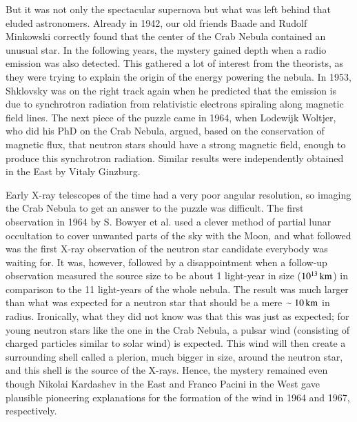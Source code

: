 But it was not only the spectacular supernova but what was left behind that eluded astronomers.
Already in 1942, our old friends Baade and Rudolf Minkowski correctly found that the center of the Crab Nebula contained an unusual star.\cite{Baade42, Minkowski42}
In the following years, the mystery gained depth when a radio emission was also detected.\cite{BSS49}
This gathered a lot of interest from the theorists, as they were trying to explain the origin of the energy powering the nebula.
In 1953, Shklovsky was on the right track again when he predicted that the emission is due to synchrotron radiation from relativistic electrons spiraling along magnetic field lines. 
The next piece of the puzzle came in 1964, when Lodewijk Woltjer, who did his PhD on the Crab Nebula, argued, based on the conservation of magnetic flux, that neutron stars should have a strong magnetic field, enough to produce this synchrotron radiation.\cite{Woltjer64}
Similar results were independently obtained in the East by Vitaly Ginzburg.\cite{Ginzburg64}


Early X-ray telescopes of the time had a very poor angular resolution, so imaging the Crab Nebula to get an answer to the puzzle was difficult.
The first observation in 1964 by S. Bowyer et al. used a clever method of partial lunar occultation to cover unwanted parts of the sky with the Moon, and what followed was the first X-ray observation of the neutron star candidate everybody was waiting for.\cite{BBC64a}
It was, however, followed by a disappointment when a follow-up observation measured the source size to be about 1 light-year in size ($10^{13}\, \mathrm{km}$) in comparison to the 11 light-years of the whole nebula.\cite{BBC64b}
The result was much larger than what was expected for a neutron star that should be a mere $\sim 10\, \mathrm{km}$ in radius.
Ironically, what they did not know was that this was just as expected;
for young neutron stars like the one in the Crab Nebula, a pulsar wind (consisting of charged particles similar to solar wind) is expected. 
This wind will then create a surrounding shell called a plerion, much bigger in size, around the neutron star, and this shell is the source of the X-rays.
Hence, the mystery remained even though Nikolai Kardashev in the East and Franco Pacini in the West gave plausible pioneering explanations for the formation of the wind in 1964 and 1967, respectively.\cite{Kardashev64, Pacini67}


